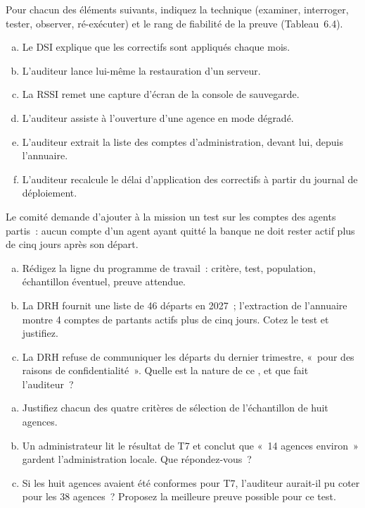 \begin{boxexo}[title={\ding{45}\quad Exercice~6.1. Techniques et preuves \niveaubase}]
Pour chacun des éléments suivants, indiquez la technique (examiner,
interroger, tester, observer, ré-exécuter) et le rang de fiabilité de la
preuve (Tableau~6.4).
\begin{enumerate}[(a)]
    \item Le DSI explique que les correctifs sont appliqués chaque mois.
    \item L'auditeur lance lui-même la restauration d'un serveur.
    \item La RSSI remet une capture d'écran de la console de sauvegarde.
    \item L'auditeur assiste à l'ouverture d'une agence en mode dégradé.
    \item L'auditeur extrait la liste des comptes d'administration, devant
          lui, depuis l'annuaire.
    \item L'auditeur recalcule le délai d'application des correctifs à
          partir du journal de déploiement.
\end{enumerate}
\end{boxexo}

\begin{boxexo}[title={\ding{45}\quad Exercice~6.2. Une ligne de programme \niveaumoyen}]
Le comité demande d'ajouter à la mission un test sur les comptes des agents
partis~: aucun compte d'un agent ayant quitté la banque ne doit rester
actif plus de cinq jours après son départ.
\begin{enumerate}[(a)]
    \item Rédigez la ligne du programme de travail~: critère, test,
          population, échantillon éventuel, preuve attendue.
    \item La DRH fournit une liste de 46 départs en 2027~; l'extraction de
          l'annuaire montre 4 comptes de partants actifs plus de cinq jours.
          Cotez le test et justifiez.
    \item La DRH refuse de communiquer les départs du dernier trimestre,
          «~pour des raisons de confidentialité~». Quelle est la nature de
          ce \NEK{}, et que fait l'auditeur~?
\end{enumerate}
\end{boxexo}

\begin{boxexo}[title={\ding{45}\quad Exercice~6.3. Ce que dit l'échantillon \niveaumoyen}]
\begin{enumerate}[(a)]
    \item Justifiez chacun des quatre critères de sélection de l'échantillon
          de huit agences.
    \item Un administrateur lit le résultat de T7 et conclut que «~14
          agences environ~» gardent l'administration locale. Que
          répondez-vous~?
    \item Si les huit agences avaient été conformes pour T7, l'auditeur
          aurait-il pu coter \OUI{} pour les 38 agences~? Proposez la
          meilleure preuve possible pour ce test.
\end{enumerate}
\end{boxexo}

